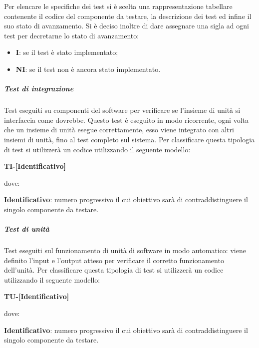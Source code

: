                 Per elencare le specifiche dei test si è scelta una rappresentazione tabellare contenente il codice del componente da testare, la descrizione dei test ed infine il suo stato di avanzamento.
                Si è deciso inoltre di dare assegnare una sigla ad ogni test per decretarne lo stato di avanzamento:
                \begin{itemize}
                    \item \textbf{I}: se il test è stato implementato;
                    \item \textbf{NI}: se il test non è ancora stato implementato.
                \end{itemize}

                    \subparagraph*{Test di integrazione}
        				Test eseguiti su componenti del software per verificare se l'insieme di unità si interfaccia come dovrebbe. Questo test è eseguito in modo ricorrente, ogni volta che un insieme di unità esegue correttamente, esso viene integrato con altri insiemi di unità, fino al test completo sul sistema.
                        Per classificare questa tipologia di test si utilizzerà un codice utilizzando il seguente modello:     

                        \begin{center}
                        \textbf{TI-[Identificativo]}
                        \end{center}
                        dove:

                        \textbf{Identificativo}: numero progressivo il cui obiettivo sarà di contraddistinguere il singolo componente da testare.

                    \subparagraph*{Test di unità}
                            Test eseguiti sul funzionamento di unità di software in modo automatico: viene definito l'input e l'output atteso per verificare il corretto funzionamento dell'unità.
                            Per classificare questa tipologia di test si utilizzerà un codice utilizzando il seguente modello:     

                            \begin{center}
                            \textbf{TU-[Identificativo]}
                            \end{center}
                            dove:

                            \textbf{Identificativo}: numero progressivo il cui obiettivo sarà di contraddistinguere il singolo componente da testare.


